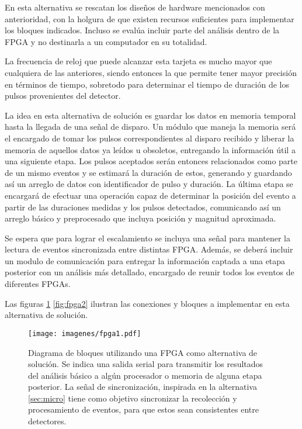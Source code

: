 \par En esta alternativa se rescatan los diseños de hardware mencionados con anterioridad, con la holgura de que existen recursos suficientes para implementar los bloques indicados. Incluso se evalúa incluir parte del análisis dentro de la FPGA y no destinarla a un computador en su totalidad.

\par La frecuencia de reloj que puede alcanzar esta tarjeta es mucho mayor que cualquiera de las anteriores, siendo entonces la que permite tener mayor precisión en términos de tiempo, sobretodo para determinar el tiempo de duración de los pulsos provenientes del detector.

\par La idea en esta alternativa de solución es guardar los datos en memoria temporal hasta la llegada de una señal de disparo. Un módulo que maneja la memoria será el encargado de tomar los pulsos correspondientes al disparo recibido y liberar la memoria de aquellos datos ya leídos u obsoletos, entregando la información útil a una siguiente etapa. Los pulsos aceptados serán entonces relacionados como parte de un mismo eventos y se estimará la duración de estos, generando y guardando así un arreglo de datos con identificador de pulso y duración. La última etapa se encargará de efectuar una operación capaz de determinar la posición del evento a partir de las duraciones medidas y los pulsos detectados, comunicando así un arreglo básico y preprocesado que incluya posición y magnitud aproximada.

\par Se espera que para lograr el escalamiento se incluya una señal para mantener la lectura de eventos sincronizada entre distintas FPGA. Además, se deberá incluir un modulo de comunicación para entregar la información captada a una etapa posterior con un análisis más detallado, encargado de reunir todos los eventos de diferentes FPGAs.

\newpage
\par Las figuras \ref{fig:fpga1} \ref{fig:fpga2} ilustran las conexiones y bloques a implementar en esta alternativa de solución.

\begin{figure}[H]
    \centering
    \texttt{[image: imagenes/fpga1.pdf]}
    \caption{Diagrama de bloques utilizando una FPGA como alternativa de solución. Se indica una salida serial para transmitir los resultados del análisis básico a algún procesador o memoria de alguna etapa posterior. La señal de sincronización, inspirada en la alternativa \ref{sec:micro} tiene como objetivo sincronizar la recolección y procesamiento de eventos, para que estos sean consistentes entre detectores.}
    \label{fig:fpga1}
\end{figure}

